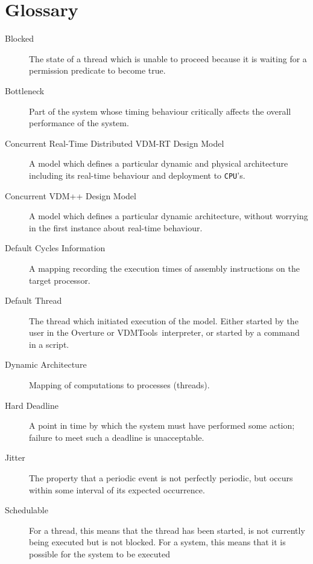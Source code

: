 \documentclass{overturerepchap}
\newcommand{\vdmtools}{VDMTools}
\begin{document}
\newpage






\newpage
\appendix


\chapter{Glossary}\label{app:glossary}

\begin{description}
\item[Blocked] The state of a thread which is unable to proceed
because it is waiting for a permission predicate to become true.
\item[Bottleneck] Part of the system whose timing behaviour critically
affects the overall performance of the system.
\item[Concurrent Real-Time Distributed VDM-RT Design Model] A model which defines a 
particular dynamic and physical architecture including its real-time behaviour and deployment to \texttt{CPU}'s.
\item[Concurrent VDM++ Design Model] A model which defines a particular dynamic
architecture, without worrying in the first instance about real-time behaviour.
\item[Default Cycles Information] A mapping recording the execution
times of assembly instructions on the target processor.
\item[Default Thread] The thread which initiated execution of the
model. Either started by the user in the Overture or \vdmtools\ interpreter, 
or started by a
command in a script.
\item[Dynamic Architecture] Mapping of computations to processes (threads).
\item[Hard Deadline] A point in time by which the system must have
performed some action; failure to meet such a deadline is
unacceptable.
\item[Jitter] The property that a periodic event is not perfectly
periodic, but occurs within some interval of its expected occurrence.
\item[Schedulable] For a thread, this means that the thread has been
started, is not currently being executed but is not blocked. For a
system, this means that it is possible for the system to be executed

\end{description}
\end{document}
